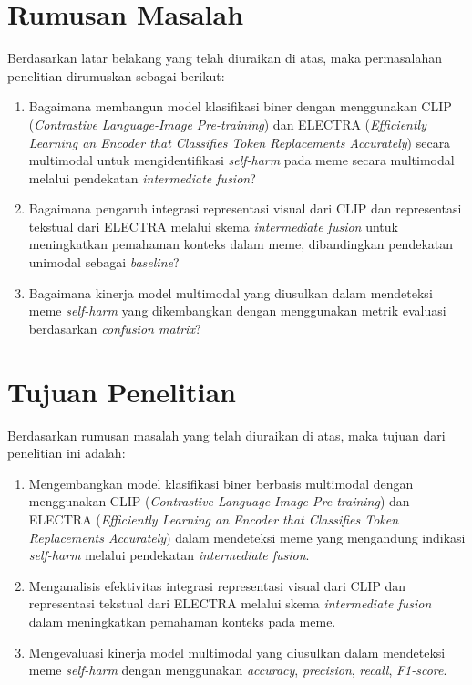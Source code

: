 \section{Rumusan Masalah} \label{I.Rumusan Masalah}

Berdasarkan latar belakang yang telah diuraikan di atas, maka permasalahan penelitian dirumuskan sebagai berikut: \par
\begin{enumerate}
    \item Bagaimana membangun model klasifikasi biner dengan menggunakan CLIP (\textit{Contrastive Language-Image Pre-training}) dan ELECTRA (\textit{Efficiently Learning an Encoder that Classifies Token Replacements Accurately}) secara multimodal untuk mengidentifikasi \textit{self-harm} pada meme secara multimodal melalui pendekatan \textit{intermediate fusion}?
    \item Bagaimana pengaruh integrasi representasi visual dari CLIP dan representasi tekstual dari ELECTRA melalui skema \textit{intermediate fusion} untuk meningkatkan pemahaman konteks dalam meme, dibandingkan pendekatan unimodal sebagai \textit{baseline}?
    \item Bagaimana kinerja model multimodal yang diusulkan dalam mendeteksi meme \textit{self-harm} yang dikembangkan dengan menggunakan metrik evaluasi berdasarkan \textit{confusion matrix}?
\end{enumerate}


\section{Tujuan Penelitian} \label{I.Tujuan}
Berdasarkan rumusan masalah yang telah diuraikan di atas, maka tujuan dari penelitian ini adalah: \par

\begin{enumerate}
    \item Mengembangkan model klasifikasi biner berbasis multimodal dengan menggunakan CLIP (\textit{Contrastive Language-Image Pre-training}) dan ELECTRA (\textit{Efficiently Learning an Encoder that Classifies Token Replacements Accurately}) dalam mendeteksi meme yang mengandung indikasi \textit{self-harm} melalui pendekatan \textit{intermediate fusion}.
    \item Menganalisis efektivitas integrasi representasi visual dari CLIP dan representasi tekstual dari ELECTRA melalui skema \textit{intermediate fusion} dalam meningkatkan pemahaman konteks pada meme.
    \item Mengevaluasi kinerja model multimodal yang diusulkan dalam mendeteksi meme \textit{self-harm} dengan menggunakan \textit{accuracy}, \textit{precision}, \textit{recall}, \textit{F1-score}.
\end{enumerate}


